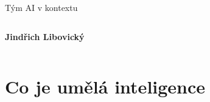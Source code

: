 \documentclass[aspectratio=169,dvipsnames,handout]{beamer}
\begin{document}
\begin{frame}{Tým AI v kontextu}
\begin{columns}
    \end{columns}

    \hspace*{40pt}\begin{columns}
        \column{30pt}
        \textbf{Jindřich Libovický}

    \end{columns}

\end{frame}

\section{Co je umělá inteligence}

\end{document}

